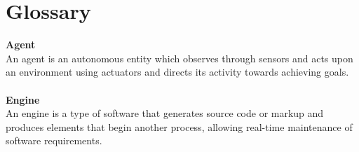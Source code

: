 \section{Glossary}

\textbf{Agent}\\
An agent is an autonomous entity which observes through sensors and acts upon an environment using actuators and directs its activity towards achieving goals.\\\\
\textbf{Engine}\\
An engine is a type of software that generates source code or markup and produces elements that begin another process, allowing real-time maintenance of software requirements.\\
\textbf{}
\textbf{}
\textbf{}
